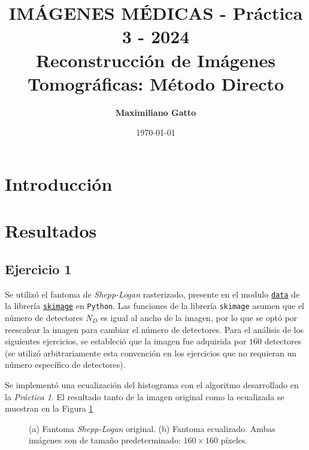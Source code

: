 \documentclass[11pt, twocolumn]{article}
\title{{\large IMÁGENES MÉDICAS - Práctica 3 - 2024} \\ \vspace{1cm}\textbf{Reconstrucción de Imágenes Tomográficas: Método Directo}}
\author[ ]{\textbf{Maximiliano Gatto}}
\affil[ ]{Instituto Balseiro (UNCuyo - CNEA) - Bariloche, Río Negro, Argentina\vspace{0.4cm}}
\affil[ ]{\href{mailto:maximiliano.gatto@ib.edu.ar}{maximiliano.gatto@ib.edu.ar}}
\date{\today}
\begin{document}
\maketitle

\section{Introducción}


\section{Resultados}

\subsection*{Ejercicio 1}
Se utilizó el fantoma de \textit{Shepp-Logan} rasterizado, presente en el modulo \href{https://scikit-image.org/docs/stable/api/skimage.data.html}{\texttt{data}} de la librería \href{https://scikit-image.org}{\texttt{skimage}} en \texttt{Python}. Las funciones de la librería \texttt{skimage} asumen que el número de detectores $N_D$ es igual al ancho de la imagen, por lo que se optó por reescalear la imagen para cambiar el número de detectores. Para el análisis de los siguientes ejercicios, se estableció que la imagen fue adquirida por $160$ detectores (se utilizó arbitrariamente esta convención en los ejercicios que no requieran un número específico de detectores). 

Se implementó una ecualización del histograma con el algoritmo desarrollado en la \textit{Práctica 1}. El resultado tanto de la imagen original como la ecualizada se muestran en la Figura \ref{fig:figuras_ej_1}

\begin{figure}[H]
    \centering
    \hfill
    \hfill
    \caption{(a) Fantoma \textit{Shepp-Logan} original. (b) Fantoma ecualizado. Ambas imágenes son de tamaño predeterminado: $160 \times 160$ píxeles.}
    \label{fig:figuras_ej_1}
  \end{figure}
\end{document}
